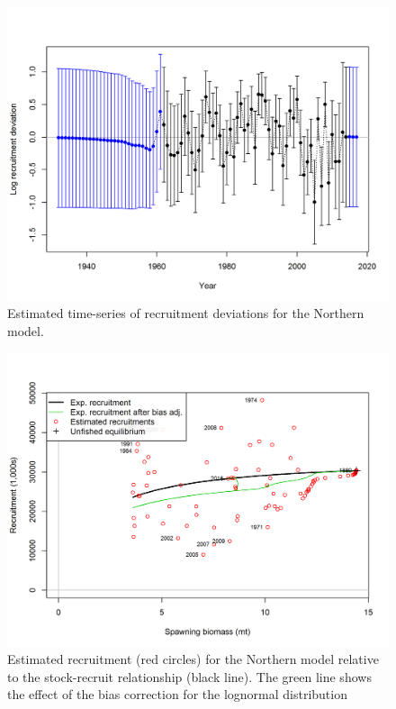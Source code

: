 \documentclass[12pt,]{article}
\begin{document}
\FloatBarrier

\begin{figure}[htbp]
\centering
\includegraphics{r4ss/plots_mod1/recdevs2_withbars.png}
\caption{Estimated time-series of recruitment deviations for the
Northern model. \label{fig:recdevs1}}
\end{figure}

\FloatBarrier

\begin{figure}[htbp]
\centering
\includegraphics{r4ss/plots_mod1/SR_curve2.png}
\caption{Estimated recruitment (red circles) for the Northern model
relative to the stock-recruit relationship (black line). The green line
shows the effect of the bias correction for the lognormal distribution
\label{fig:stock_recruit_curve}}
\end{figure}
\end{document}
